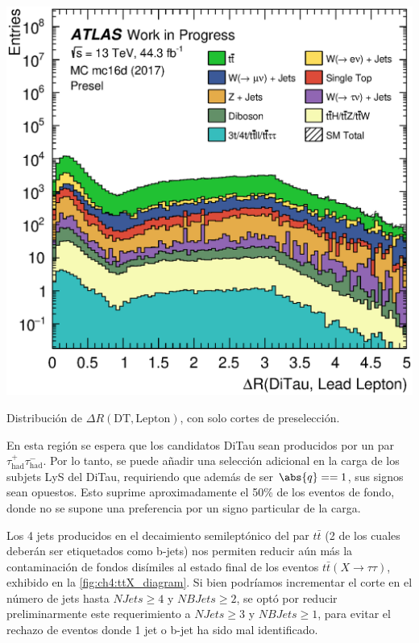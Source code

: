 \begin{marginfigure}
    \includegraphics[width=0.99\linewidth]{Assets/Plots/Presel/h_stack_mc16d_ditau_lepton_dr.eps}
    \caption{Distribución de $\Delta R(\text{DT}, \text{Lepton})$, con solo cortes de preselección.}
    \label{fig:ch4:presel:h_ditau_lepton_dr}
\end{marginfigure}

En esta región se espera que los candidatos DiTau sean producidos por un par $\tau^+_{\text{had}} \tau^-_{\text{had}}$. Por lo tanto, se puede añadir una selección adicional en la carga de los subjets LyS del DiTau, requiriendo que además de ser $\abs{q} == 1$, sus signos sean opuestos. Esto suprime aproximadamente el 50\% de los eventos de fondo, donde no se supone una preferencia por un signo particular de la carga.

Los 4 jets producidos en el decaimiento semileptónico del par $t\bar{t}$ (2 de los cuales deberán ser etiquetados como b-jets) nos permiten reducir aún más la contaminación de fondos disímiles al estado final de los eventos $t\bar{t}(X\to\tau\tau)$, exhibido en la \cref{fig:ch4:ttX_diagram}. Si bien podríamos incrementar el corte en el número de jets hasta $NJets \geq 4$ y $NBJets \geq 2$, se optó por reducir preliminarmente este requerimiento a $NJets \geq 3$ y $NBJets \geq 1$, para evitar el rechazo de eventos donde 1 jet o b-jet ha sido mal identificado.

